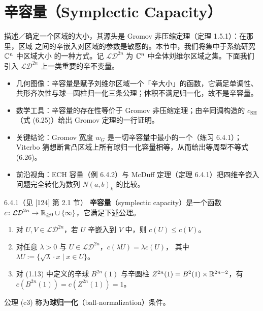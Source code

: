 \section{辛容量（Symplectic Capacity）}

描述／确定一个区域的大小，其源头是 Gromov 非压缩定理（定理 1.5.1）：在那里，区域
之间的辛嵌入对区域的参数是敏感的。本节中，我们将集中于系统研究 $\mathbb{C}^n$ 中区域大小
的一种方式。记 $\mathcal{LD}^{2n}$ 为 $\mathbb{C}^n$ 中全体刘维尔区域之集。下面我们引入
$\mathcal{LD}^{2n}$ 上一类重要的辛不变量。

\begin{keytakeaways}
\begin{itemize}
  \item 几何图像：辛容量是赋予刘维尔区域一个「辛大小」的函数，它满足单调性、
        共形齐次性与球—圆柱归一化三条公理；体积不满足归一化，故不是辛容量。
  \item 数学工具：辛容量的存在性等价于 Gromov 非压缩定理；由辛同调构造的
        $c_{\mathrm{SH}}$（式 (6.25)）给出 Gromov 定理的一行证明。
  \item 关键结论：Gromov 宽度 $w_G$ 是一切辛容量中最小的一个（练习 6.4.1）；
        Viterbo 猜想断言凸区域上所有球归一化容量相等，从而给出等周型不等式
        (6.26)。
  \item 前沿视角：ECH 容量（例 6.4.2）与 McDuff 定理（定理 6.4.1）把四维辛嵌入
        问题完全转化为数列 $N(a,b)_k$ 的比较。
\end{itemize}
\end{keytakeaways}

\begin{wdefn}{6.4.1（见 [124] 第 2.1 节）}
  \textbf{辛容量}（symplectic capacity）是一个函数
  $c\colon\mathcal{LD}^{2n}\to\mathbb{R}_{\ge0}\cup\{\infty\}$，它满足下述公理。
  \begin{enumerate}[label=(c\arabic*)]
    \item 对 $U,V\in\mathcal{LD}^{2n}$，若 $U$ 辛嵌入到 $V$ 中，则 $c(U)\le c(V)$。
    \item 对任意 $\lambda>0$ 与 $U\in\mathcal{LD}^{2n}$，$c(\lambda U)=\lambda c(U)$，
          其中 $\lambda U:=\{\sqrt{\lambda}\cdot x\mid x\in U\}$。
    \item 对 (1.13) 中定义的辛球 $B^{2n}(1)$ 与辛圆柱
          $Z^{2n}(1)=B^2(1)\times\mathbb{R}^{2n-2}$，有 $c(B^{2n}(1))=c(Z^{2n}(1))=1$。
  \end{enumerate}
  公理 (c3) 称为\textbf{球归一化}（ball-normalization）条件。
\end{wdefn}

